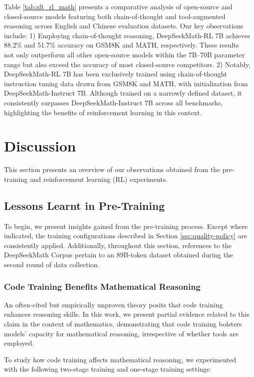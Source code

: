 \begin{itemize}[topsep=0pt]
\begin{itemize}[topsep=0pt]
Table \ref{tab:sft_rl_math} presents a comparative analysis of open-source and closed-source models featuring both chain-of-thought and tool-augmented reasoning across English and Chinese evaluation datasets. Our key observations include: 1) Employing chain-of-thought reasoning, DeepSeekMath-RL 7B achieves 88.2\% and 51.7\% accuracy on GSM8K and MATH, respectively. These results not only outperform all other open-source models within the 7B–70B parameter range but also exceed the accuracy of most closed-source competitors. 2) Notably, DeepSeekMath-RL 7B has been exclusively trained using chain-of-thought instruction tuning data drawn from GSM8K and MATH, with initialization from DeepSeekMath-Instruct 7B. Although trained on a narrowly defined dataset, it consistently surpasses DeepSeekMath-Instruct 7B across all benchmarks, highlighting the benefits of reinforcement learning in this context.

\section{Discussion}
This section presents an overview of our observations obtained from the pre-training and reinforcement learning (RL) experiments.

\subsection{Lessons Learnt in Pre-Training}

To begin, we present insights gained from the pre-training process. Except where indicated, the training configurations described in Section \ref{sec:quality-policy} are consistently applied. Additionally, throughout this section, references to the DeepSeekMath Corpus pertain to an 89B-token dataset obtained during the second round of data collection.

\subsubsection{Code Training Benefits Mathematical Reasoning}

An often-cited but empirically unproven theory posits that code training enhances reasoning skills. In this work, we present partial evidence related to this claim in the context of mathematics, demonstrating that code training bolsters models' capacity for mathematical reasoning, irrespective of whether tools are employed.

To study how code training affects mathematical reasoning, we experimented with the following two-stage training and one-stage training settings:


\end{itemize}
\end{itemize}
